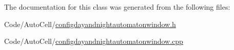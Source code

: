 The documentation for this class was generated from the following files\+:\begin{DoxyCompactItemize}
\item 
Code/\+Auto\+Cell/\mbox{\hyperlink{configdayandnightautomatonwindow_8h}{configdayandnightautomatonwindow.\+h}}\item 
Code/\+Auto\+Cell/\mbox{\hyperlink{configdayandnightautomatonwindow_8cpp}{configdayandnightautomatonwindow.\+cpp}}\end{DoxyCompactItemize}
